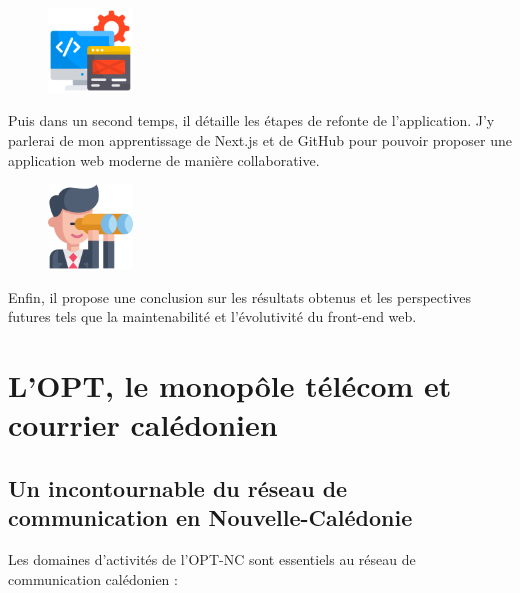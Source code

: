 \documentclass[12pt,a4paper]{report}
\begin{document}
\vspace{1cm}
\begin{figure}[h] %
    \centering
    \includegraphics[width=0.2\textwidth]{ressources_rapport/app_web.png}
\end{figure}
Puis dans un second temps, il détaille les étapes de refonte de l’application. J'y parlerai de mon apprentissage de Next.js et de GitHub pour pouvoir proposer une application web moderne de manière collaborative.

\vspace{1cm}
\begin{figure}[h] %
    \centering
    \includegraphics[width=0.2\textwidth]{ressources_rapport/perspectives.png}
\end{figure}
Enfin, il propose une conclusion sur les résultats obtenus et les perspectives futures tels que la maintenabilité et l'évolutivité du front-end web.

\chapter{L'OPT, le monopôle télécom et courrier calédonien}
\section{Un incontournable du réseau de communication en Nouvelle-Calédonie}
Les domaines d'activités de l'OPT-NC sont essentiels au réseau de communication calédonien :

\vspace{0.5cm}
\end{document}
